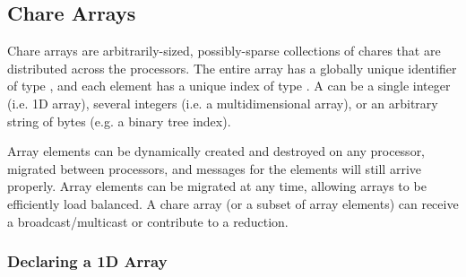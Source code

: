 \subsection{Chare Arrays}
\label{basic arrays}

Chare arrays are
arbitrarily-sized, possibly-sparse collections of chares that are distributed
across the processors. The entire array has a globally unique identifier of
type , and each element has a unique index of type
. A  can be a single integer (i.e. 1D array),
several integers (i.e. a multidimensional array), or an arbitrary string of
bytes (e.g. a binary tree index).

Array elements can be dynamically created and destroyed on any processor,
migrated between processors, and messages for the elements will still arrive
properly. Array elements can be migrated at any time, allowing arrays to be
efficiently load balanced. A chare array (or a subset of array elements) can
receive a broadcast/multicast or contribute to a reduction.

\subsubsection{Declaring a 1D Array}


